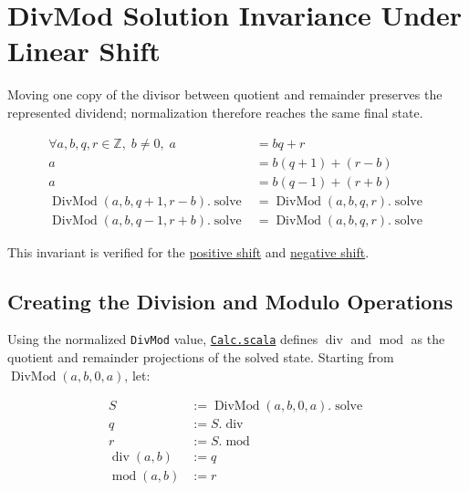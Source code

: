 \section{DivMod Solution Invariance Under Linear Shift}
\label{sec:shift-invariance}

Moving one copy of the divisor between quotient and remainder preserves the
represented dividend; normalization therefore reaches the same final state.

\begin{equation*}
\begin{aligned}
\forall a,b,q,r \in \mathbb{Z},\; b \neq 0,\; a &= bq + r \\
a &= b(q+1) + (r-b) \\
a &= b(q-1) + (r+b) \\
\operatorname{DivMod}(a,b,q+1,r-b).\operatorname{solve}
  &= \operatorname{DivMod}(a,b,q,r).\operatorname{solve} \\
\operatorname{DivMod}(a,b,q-1,r+b).\operatorname{solve}
  &= \operatorname{DivMod}(a,b,q,r).\operatorname{solve}
\end{aligned}
\end{equation*}

This invariant is verified for the
\href{https://github.com/thiagomata/prime-numbers/blob/modulo-article-v1.0.0/src/main/scala/v1/chapter2/div/properties/ModIdempotence.scala#assertDivModWithMoreDivAndLessModSameSolution}{positive shift}
and
\href{https://github.com/thiagomata/prime-numbers/blob/modulo-article-v1.0.0/src/main/scala/v1/chapter2/div/properties/ModIdempotence.scala#assertDivModWithLessDivAndMoreModSameSolution}{negative shift}.

\subsection{Creating the Division and Modulo Operations}
\label{sec:creating-operations}

Using the normalized \texttt{DivMod} value,
\href{https://github.com/thiagomata/prime-numbers/blob/modulo-article-v1.0.0/src/main/scala/v1/chapter2/div/Calc.scala}{\texttt{Calc.scala}}
defines $\operatorname{div}$ and $\operatorname{mod}$ as the quotient and
remainder projections of the solved state. Starting from
$\operatorname{DivMod}(a,b,0,a)$, let:

\begin{equation*}
\begin{aligned}
S &:= \operatorname{DivMod}(a,b,0,a).\operatorname{solve} \\
q &:= S.\operatorname{div} \\
r &:= S.\operatorname{mod} \\
\operatorname{div}(a,b) &:= q \\
\operatorname{mod}(a,b) &:= r
\end{aligned}
\end{equation*}

